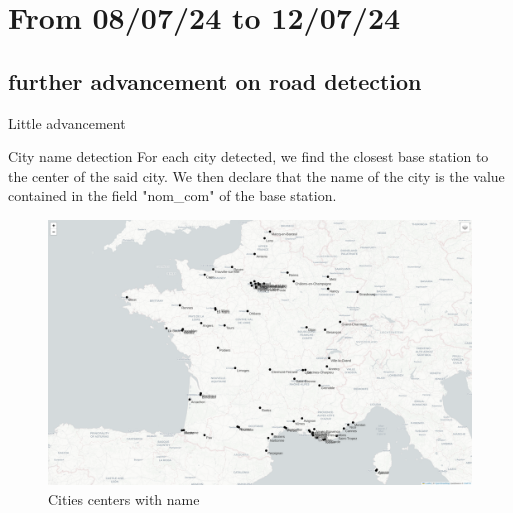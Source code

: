 \smallframetitle

\section{From 08/07/24 to 12/07/24}
\insertsectionframe

\subsection{further advancement on road detection}
\insertsubsectionframe

\begin{frame}{Little advancement}
    \begin{block}{City name detection}
        For each city detected, we find the closest base station to the center of the said city. 
        We then declare that the name of the city is the value contained in the field "nom\_com" of the base station.
    \end{block}

    \begin{figure}
        \includegraphics[height=0.4\paperheight]{images/road_detection/cities_centers_with_name.png}
        \caption{Cities centers with name}
    \end{figure}
\end{frame}

